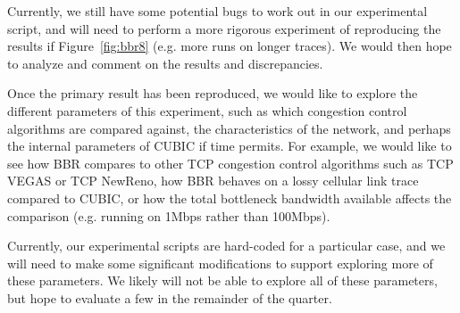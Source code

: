 Currently, we still have some potential bugs to work out in our experimental
script, and will need to perform a more rigorous experiment of reproducing
the results if Figure~\ref{fig:bbr8} (e.g. more runs on longer traces).
We would then hope to analyze and comment on the results and discrepancies.

Once the primary result has been reproduced, we would like to explore the
different parameters of this experiment, such as which congestion control
algorithms are compared against, the characteristics of the network, and
perhaps the internal parameters of CUBIC if time permits. For example,
we would like to see how BBR compares to other TCP congestion control
algorithms such as TCP VEGAS or TCP NewReno, how BBR behaves on a lossy
cellular link trace compared to CUBIC, or how the total bottleneck bandwidth
available affects the comparison (e.g. running on 1Mbps rather than 100Mbps).

Currently, our experimental scripts are hard-coded for a particular case, and
we will need to make some significant modifications to support exploring more
of these parameters. We likely will not be able to explore all of these
parameters, but hope to evaluate a few in the remainder of the quarter.

%
%
%
%
